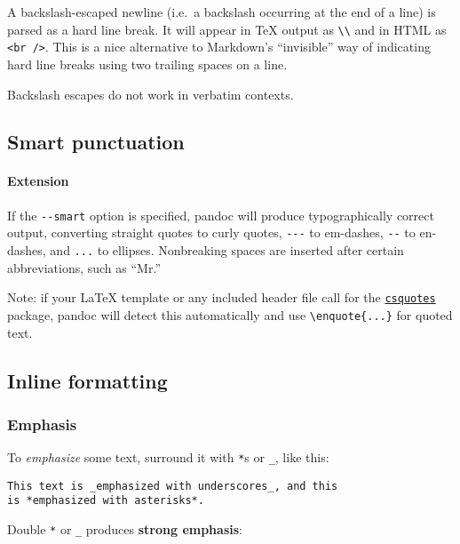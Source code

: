 \documentclass[]{article}
\let\oldparagraph\paragraph
\renewcommand{\paragraph}[1]{\oldparagraph{#1}\mbox{}}
\begin{document}
A backslash-escaped newline (i.e.~a backslash occurring at the end of a
line) is parsed as a hard line break. It will appear in TeX output as
\texttt{\textbackslash{}\textbackslash{}} and in HTML as
\texttt{\textless{}br\ /\textgreater{}}. This is a nice alternative to
Markdown's ``invisible'' way of indicating hard line breaks using two
trailing spaces on a line.

Backslash escapes do not work in verbatim contexts.

\hypertarget{smart-punctuation}{\subsection{Smart
punctuation}\label{smart-punctuation}}

\paragraph{Extension}\label{extension}

If the \texttt{-\/-smart} option is specified, pandoc will produce
typographically correct output, converting straight quotes to curly
quotes, \texttt{-\/-\/-} to em-dashes, \texttt{-\/-} to en-dashes, and
\texttt{...} to ellipses. Nonbreaking spaces are inserted after certain
abbreviations, such as ``Mr.''

Note: if your LaTeX template or any included header file call for the
\href{https://ctan.org/pkg/csquotes}{\texttt{csquotes}} package, pandoc
will detect this automatically and use
\texttt{\textbackslash{}enquote\{...\}} for quoted text.

\hypertarget{inline-formatting}{\subsection{Inline
formatting}\label{inline-formatting}}

\subsubsection{Emphasis}\label{emphasis}

To \emph{emphasize} some text, surround it with \texttt{*}s or
\texttt{\_}, like this:

\begin{verbatim}
This text is _emphasized with underscores_, and this
is *emphasized with asterisks*.
\end{verbatim}

Double \texttt{*} or \texttt{\_} produces \textbf{strong emphasis}:
\end{document}
